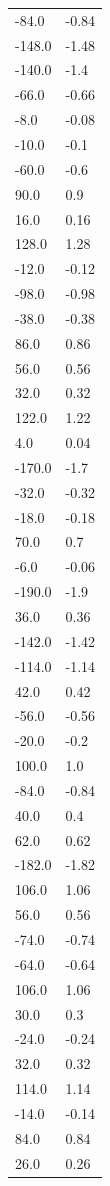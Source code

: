 \begin{longtable}{ll}
-84.0 & -0.84 \\
-148.0 & -1.48 \\
-140.0 & -1.4 \\
-66.0 & -0.66 \\
-8.0 & -0.08 \\
-10.0 & -0.1 \\
-60.0 & -0.6 \\
90.0 & 0.9 \\
16.0 & 0.16 \\
128.0 & 1.28 \\
-12.0 & -0.12 \\
-98.0 & -0.98 \\
-38.0 & -0.38 \\
86.0 & 0.86 \\
56.0 & 0.56 \\
32.0 & 0.32 \\
122.0 & 1.22 \\
4.0 & 0.04 \\
-170.0 & -1.7 \\
-32.0 & -0.32 \\
-18.0 & -0.18 \\
70.0 & 0.7 \\
-6.0 & -0.06 \\
-190.0 & -1.9 \\
36.0 & 0.36 \\
-142.0 & -1.42 \\
-114.0 & -1.14 \\
42.0 & 0.42 \\
-56.0 & -0.56 \\
-20.0 & -0.2 \\
100.0 & 1.0 \\
-84.0 & -0.84 \\
40.0 & 0.4 \\
62.0 & 0.62 \\
-182.0 & -1.82 \\
106.0 & 1.06 \\
56.0 & 0.56 \\
-74.0 & -0.74 \\
-64.0 & -0.64 \\
106.0 & 1.06 \\
30.0 & 0.3 \\
-24.0 & -0.24 \\
32.0 & 0.32 \\
114.0 & 1.14 \\
-14.0 & -0.14 \\
84.0 & 0.84 \\
26.0 & 0.26 \\

\end{longtable}
